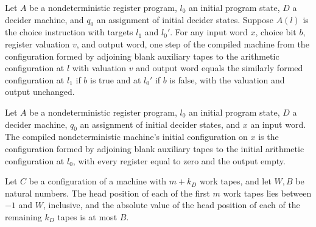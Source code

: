 \begin{lemma}
\label{Complexity.LogProg.ncompileTM_stepWith_choose}
\leanok
{}
Let $A$ be a nondeterministic register program, $l_0$ an initial program state, $D$ a
decider machine, and $q_0$ an assignment of initial decider states. Suppose $A(l)$ is
the choice instruction with targets $l_1$ and $l_0'$. For any input word $x$, choice bit
$b$, register valuation $v$, and output word, one step of the compiled machine from the
configuration formed by adjoining blank auxiliary tapes to the arithmetic configuration
at $l$ with valuation $v$ and output word equals the similarly formed configuration at
$l_1$ if $b$ is true and at $l_0'$ if $b$ is false, with the valuation and output
unchanged.
\end{lemma}

\begin{lemma}
\label{Complexity.LogProg.ncompileTM_init}
\leanok
{}
Let $A$ be a nondeterministic register program, $l_0$ an initial program state, $D$ a
decider machine, $q_0$ an assignment of initial decider states, and $x$ an input word.
The compiled nondeterministic machine's initial configuration on $x$ is the
configuration formed by adjoining blank auxiliary tapes to the initial arithmetic
configuration at $l_0$, with every register equal to zero and the output empty.
\end{lemma}

\begin{definition}
\label{Complexity.LogProg.NBox}
\leanok
{}
Let $C$ be a configuration of a machine with $m+k_D$ work tapes, and let $W,B$ be
natural numbers. The head position of each of the first $m$ work tapes lies between $-1$
and $W$, inclusive, and the absolute value of the head position of each of the remaining
$k_D$ tapes is at most $B$.
\end{definition}

